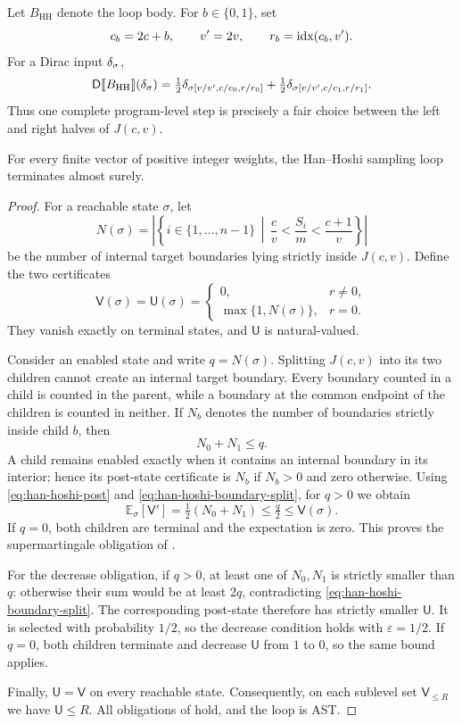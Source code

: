 Let $B_{\mathrm{HH}}$ denote the loop body.  For $b\in\{0,1\}$, set
\[
 c_b=2c+b,\qquad v'=2v,\qquad r_b=\textnormal{idx}(c_b,v').
\]
For a Dirac input $\delta_{\sigma}$,
\begin{equation}
 \mathsf{D}\llbracket B_{\mathrm{HH}}\rrbracket(\delta_{\sigma})
 =\tfrac12\delta_{\sigma[v/v',c/c_0,r/r_0]}
 +\tfrac12\delta_{\sigma[v/v',c/c_1,r/r_1]}.
 \label{eq:han-hoshi-post}
\end{equation}
Thus one complete program-level step is precisely a fair choice between
the left and right halves of $J(c,v)$.

\begin{theorem}
 \label{thm:han-hoshi}
For every finite vector of positive integer weights, the Han--Hoshi
sampling loop terminates almost surely.
\end{theorem}
\begin{proof}
For a reachable state $\sigma$, let
\[
 N(\sigma)
 =\left|\left\{i\in\{1,\ldots,n-1\}\,\middle|\,
 \frac cv<\frac{S_i}{m}<\frac{c+1}{v}\right\}\right|
\]
be the number of internal target boundaries lying strictly inside
$J(c,v)$.  Define the two certificates
\[
 \mathsf V(\sigma)=\mathsf U(\sigma)=
 \begin{cases}
 0,&r\ne0,\\
 \max\{1,N(\sigma)\},&r=0.
 \end{cases}
\]
They vanish exactly on terminal states, and $\mathsf U$ is
natural-valued.

Consider an enabled state and write $q=N(\sigma)$.  Splitting $J(c,v)$
into its two children cannot create an internal target boundary.  Every
boundary counted in a child is counted in the parent, while a boundary at
the common endpoint of the children is counted in neither.  If $N_b$
denotes the number of boundaries strictly inside child $b$, then
\begin{equation}
 N_0+N_1\le q.
 \label{eq:han-hoshi-boundary-split}
\end{equation}
A child remains enabled exactly when it contains an internal boundary in
its interior; hence its post-state certificate is $N_b$ if $N_b>0$ and
zero otherwise.  Using \eqref{eq:han-hoshi-post} and
\eqref{eq:han-hoshi-boundary-split}, for $q>0$ we obtain
\[
 \mathbb E_\sigma[\mathsf V']
 =\tfrac12(N_0+N_1)
 \le\tfrac q2
 \le \mathsf V(\sigma).
\]
If $q=0$, both children are terminal and the expectation is zero.  This
proves the supermartingale obligation of .

For the decrease obligation, if $q>0$, at least one of $N_0,N_1$ is
strictly smaller than $q$: otherwise their sum would be at least $2q$,
contradicting \eqref{eq:han-hoshi-boundary-split}.  The corresponding
post-state therefore has strictly smaller $\mathsf U$.  It is selected
with probability $1/2$, so the decrease condition holds with
$\varepsilon=1/2$.  If $q=0$, both children terminate and decrease
$\mathsf U$ from $1$ to $0$, so the same bound applies.

Finally, $\mathsf U=\mathsf V$ on every reachable state.  Consequently,
on each sublevel set $\mathsf V_{\le R}$ we have
$\mathsf U\le R$.  All obligations of  hold, and
the loop is AST.
\end{proof}


